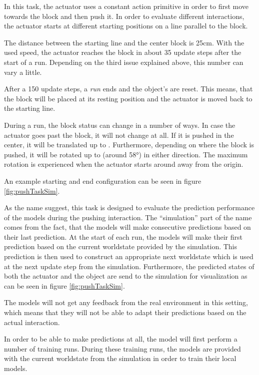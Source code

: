 In this task, the actuator uses a constant action primitive in order to first move towards the block and then push it.
In order to evaluate different interactions, the actuator starts at different starting positions on a line parallel to the block. 

The distance between the starting line and the center block is 25cm. With the used speed, the actuator reaches the block in about 35 update steps after the start of a run. Depending on the third issue explained above, this number can vary a little.

After a 150 update steps, a \textit{run} ends and the object's are reset. This means, that the block will be placed at its resting position and the actuator is moved back to the starting line. 

During a run, the block status can change in a number of ways. In case the actuator goes past the block, it will not change at all. If it is pushed in the center, it will be translated up to . Furthermore, depending on where the block is pushed, it will be rotated up to  (around 58°) in either direction. The maximum rotation is experienced when the actuator starts around  away from the origin.

An example starting and end configuration can be seen in figure \ref{fig:pushTaskSim}. 

As the name suggest, this task is designed to evaluate the prediction performance of the models during the pushing interaction. The \enquote{simulation} part of the name comes from the fact, that the models will make consecutive predictions based on their last prediction. At the start of each run, the models will make their first prediction based on the current worldstate provided by the simulation. This prediction is then used to construct an appropriate next worldstate which is used at the next update step from the simulation.
Furthermore, the predicted states of both the actuator and the object are send to the simulation for visualization as can be seen in figure \ref{fig:pushTaskSim}.

The models will not get any feedback from the real environment in this setting, which means that they will not be able to adapt their predictions based on the actual interaction. 

In order to be able to make predictions at all, the model will first perform a number of training runs. During these training runs, the models are provided with the current worldstate from the simulation in order to train their local models.

